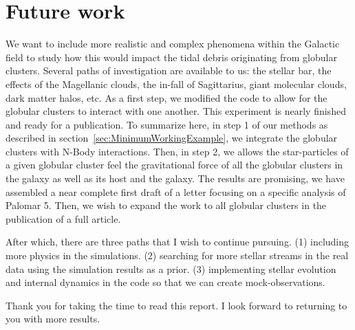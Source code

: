 \section{Future work}

We want to include more realistic and complex phenomena within the Galactic field to study how this would impact the tidal debris originating from globular clusters. Several paths of investigation are available to us: the stellar bar, the effects of the Magellanic clouds, the in-fall of Sagittarius, giant molecular clouds, dark matter halos, etc. As a first step, we modified the code to allow for the globular clusters to interact with one another. This experiment is nearly finished and ready for a publication. To summarize here, in step 1 of our methods as described in section~\ref{sec:MinimumWorkingExample}, we integrate the globular clusters with N-Body interactions. Then, in step 2, we allows the star-particles of a given globular cluster feel the gravitational force of all the globular clusters in the galaxy as well as its host and the galaxy. The results are promising, we have assembled a near complete first draft of a letter focusing on a specific analysis of Palomar 5. Then, we wish to expand the work to all globular clusters in the publication of a full article. 

After which, there are three paths that I wish to continue pursuing. (1) including more physics in the simulations. (2) searching for more stellar streams in the real data using the simulation results as a prior. (3) implementing stellar evolution and internal dynamics in the code so that we can create mock-observations. 

Thank you for taking the time to read this report. I look forward to returning to you with more results. 

